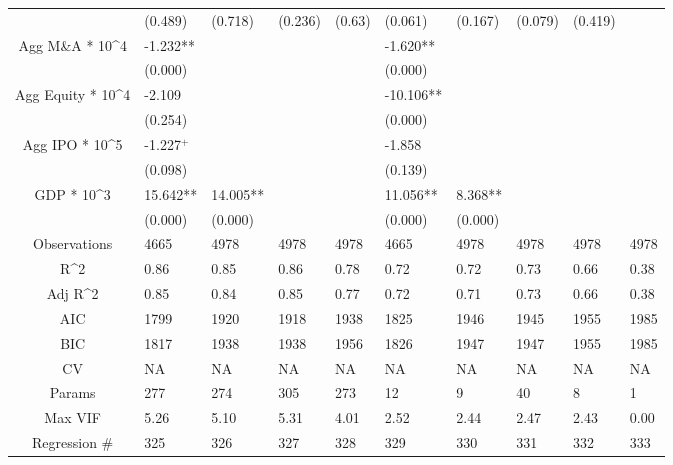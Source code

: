 \documentclass{article}
\begin{document}
\begin{table}[H]
\begin{tabular}{|clllllllll|}
   & (0.489) & (0.718) & (0.236) & (0.63) & (0.061) & (0.167) & (0.079) & (0.419) &  \\
  Agg M\&A * 10^4 & -1.232** &  &  &  & -1.620** &  &  &  &  \\
   & (0.000) &  &  &  & (0.000) &  &  &  &  \\
  Agg Equity * 10^4 & -2.109 &  &  &  & -10.106** &  &  &  &  \\
   & (0.254) &  &  &  & (0.000) &  &  &  &  \\
  Agg IPO * 10^5 & -1.227$^{+}$ &  &  &  & -1.858 &  &  &  &  \\
   & (0.098) &  &  &  & (0.139) &  &  &  &  \\
  GDP * 10^3 & 15.642** & 14.005** &  &  & 11.056** & 8.368** &  &  &  \\
   & (0.000) & (0.000) &  &  & (0.000) & (0.000) &  &  &  \\
  \hline
 Observations & 4665 & 4978 & 4978 & 4978 & 4665 & 4978 & 4978 & 4978 & 4978 \\
  R^2 & 0.86 & 0.85 & 0.86 & 0.78 & 0.72 & 0.72 & 0.73 & 0.66 & 0.38 \\
  Adj R^2 & 0.85 & 0.84 & 0.85 & 0.77 & 0.72 & 0.71 & 0.73 & 0.66 & 0.38 \\
  AIC & 1799 & 1920 & 1918 & 1938 & 1825 & 1946 & 1945 & 1955 & 1985 \\
  BIC & 1817 & 1938 & 1938 & 1956 & 1826 & 1947 & 1947 & 1955 & 1985 \\
  CV & NA & NA & NA & NA & NA & NA & NA & NA & NA \\
  Params & 277 & 274 & 305 & 273 & 12 & 9 & 40 & 8 & 1 \\
  Max VIF & 5.26 & 5.10 & 5.31 & 4.01 & 2.52 & 2.44 & 2.47 & 2.43 & 0.00 \\
  Regression \# & 325 & 326 & 327 & 328 & 329 & 330 & 331 & 332 & 333 \\
   \hline
\end{tabular}

\end{table}
\end{document}
